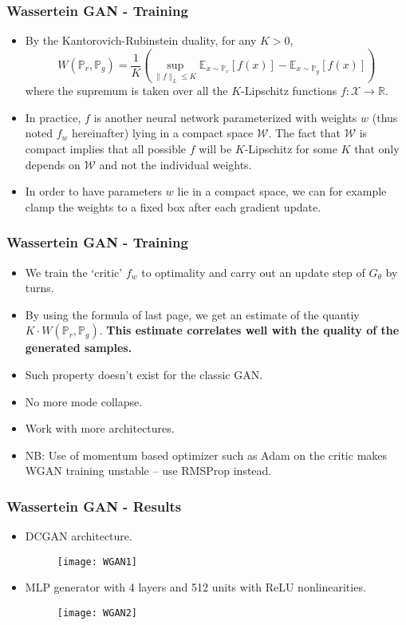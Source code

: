 \begin{frame}
  \frametitle{Wassertein GAN - Training}
  \begin{itemize}
    \item By the Kantorovich-Rubinstein duality, for any $K > 0$,
      \[
        W(\mathbb{P}_r, \mathbb{P}_g)
        = \frac{1}{K} \left( \sup_{\|f\|_L \le K}
        \mathbb{E}_{x\sim\mathbb{P}_r}[f(x)]
        - \mathbb{E}_{x\sim\mathbb{P}_g}[f(x)]
        \right)
      \]
      where the supremum is taken over all the $K$-Lipschitz functions
      $f: \mathcal{X} \rightarrow \mathbb{R}$.
    \item In practice, $f$ is another neural network parameterized with
      weights $w$ (thus noted $f_w$ hereinafter) lying in a compact space
      $\mathcal{W}$. The fact that $\mathcal{W}$ is compact
      implies that all possible $f$ will be $K$-Lipschitz for some $K$ that
      only depends on $\mathcal{W}$ and not the individual weights.
    \item In order to have parameters $w$ lie in a compact space, we can for
      example clamp the weights to a fixed box after each gradient update.
  \end{itemize}
\end{frame}

\begin{frame}
  \frametitle{Wassertein GAN - Training}
  \begin{itemize}
    \item We train the `critic' $f_w$ to optimality and carry
      out an update step of $G_{\theta}$ by turns.
    \item By using the formula of last page, we get an estimate of the quantiy
      $K \cdot W(\mathbb{P}_r, \mathbb{P}_g)$. \textbf{This estimate correlates
      well with the quality of the generated samples.}
    \item Such property doesn't exist for the classic GAN.
    \item No more mode collapse.
    \item Work with more architectures.
    \item NB: Use of momentum based optimizer such as Adam on the critic makes
      WGAN training unstable -- use RMSProp instead.
  \end{itemize}
\end{frame}

\begin{frame}
  \frametitle{Wassertein GAN - Results}
  \begin{itemize}
    \item DCGAN architecture.
      \begin{figure}
        \texttt{[image: WGAN1]}
      \end{figure}
    \item MLP generator with 4 layers and 512 units with ReLU nonlinearities.
      \begin{figure}
        \texttt{[image: WGAN2]}
      \end{figure}
  \end{itemize}
\end{frame}

